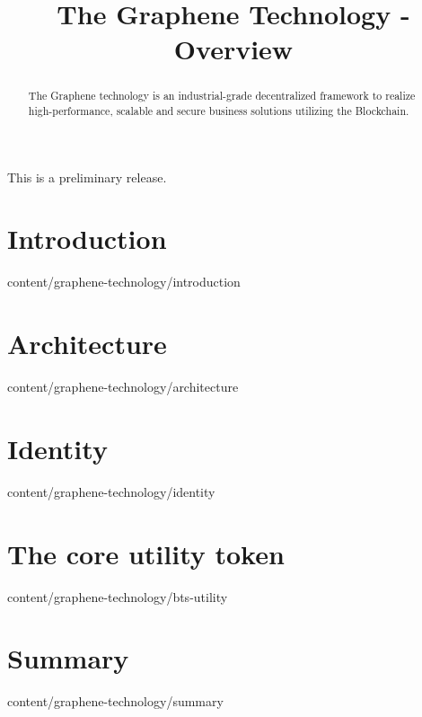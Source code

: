 \documentclass{btswhitepaper}
\title{The Graphene Technology - Overview}
\begin{document}
\maketitle

This is a preliminary release.\\

\begin{abstract}%
 The Graphene technology is an industrial-grade decentralized framework to realize 
high-performance, scalable and secure business solutions utilizing the Blockchain.
\end{abstract}

\section { Introduction            }  { content/graphene-technology/introduction } 

\section { Architecture            }  { content/graphene-technology/architecture } 

\section { Identity                }  { content/graphene-technology/identity     } 

\section { The core utility token }  { content/graphene-technology/bts-utility  } 

\section { Summary }  { content/graphene-technology/summary  } 



\end{document}
